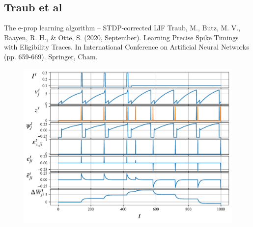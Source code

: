 \documentclass[t]{beamer}
\begin{document}
\subsection{Traub et al}
\begin{frame}{The e-prop learning algorithm -- STDP-corrected LIF}
\tiny{
Traub, M., Butz, M. V., Baayen, R. H., \& Otte, S. (2020, September). Learning Precise Spike Timings with Eligibility Traces. In International Conference on Artificial Neural Networks (pp. 659-669). Springer, Cham.}

	\begin{figure}[!ht]
		\includegraphics[width=0.78\linewidth]{demo_traub_lif.pdf}
	\end{figure}

\end{frame}
\end{document}
